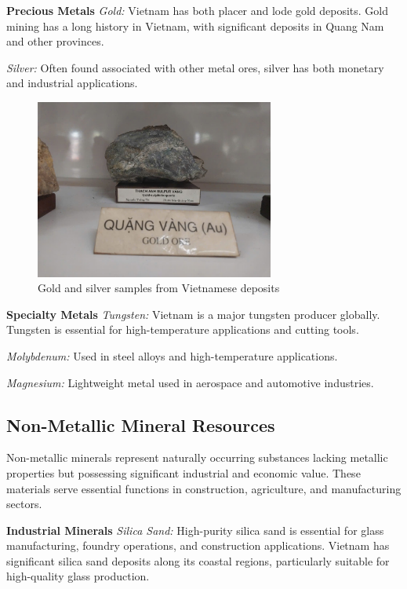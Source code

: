 \textbf{Precious Metals}
\textit{Gold:} Vietnam has both placer and lode gold deposits. Gold mining has a long history in Vietnam, with significant deposits in Quang Nam and other provinces.

\textit{Silver:} Often found associated with other metal ores, silver has both monetary and industrial applications.

\begin{figure}[H]
\centering
\includegraphics[width=0.7\textwidth]{graphics/precious_metals.png}
\caption{Gold and silver samples from Vietnamese deposits}
\label{fig:precious_metals}
\end{figure}

\textbf{Specialty Metals}
\textit{Tungsten:} Vietnam is a major tungsten producer globally. Tungsten is essential for high-temperature applications and cutting tools.

\textit{Molybdenum:} Used in steel alloys and high-temperature applications.

\textit{Magnesium:} Lightweight metal used in aerospace and automotive industries.

\subsection{Non-Metallic Mineral Resources}

Non-metallic minerals represent naturally occurring substances lacking metallic properties but possessing significant industrial and economic value. These materials serve essential functions in construction, agriculture, and manufacturing sectors.

\textbf{Industrial Minerals}
\textit{Silica Sand:} High-purity silica sand is essential for glass manufacturing, foundry operations, and construction applications. Vietnam has significant silica sand deposits along its coastal regions, particularly suitable for high-quality glass production.

